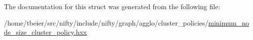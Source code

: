 The documentation for this struct was generated from the following file\+:\begin{DoxyCompactItemize}
\item 
/home/tbeier/src/nifty/include/nifty/graph/agglo/cluster\+\_\+policies/\hyperlink{minimum__node__size__cluster__policy_8hxx}{minimum\+\_\+node\+\_\+size\+\_\+cluster\+\_\+policy.\+hxx}\end{DoxyCompactItemize}
